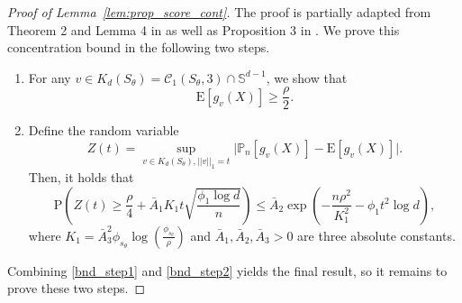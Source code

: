 \documentclass[ejsv2,noshowframe]{imsart}
\theoremstyle{plain}
\theoremstyle{definition}
\theoremstyle{remark}
\newcommand{\norm}[1]{\left|\left| #1 \right|\right|}
\begin{document}
\begin{proof}[Proof of Lemma~\ref{lem:prop_score_cont}]
	The proof is partially adapted from Theorem 2 and Lemma 4 in \cite{cai2023statistical} as well as Proposition 3 in \cite{negahban2010unified}. We prove this concentration bound in the following two steps.
	\begin{enumerate}
		\item For any $v\in K_d(S_{\theta}) = \mathcal{C}_1(S_{\theta},3) \cap \mathbb{S}^{d-1}$, we show that
		\begin{equation}
			\label{bnd_step1}
			\mathrm{E}\left[g_v(X)\right] \geq \frac{\rho}{2}.
		\end{equation}
		\item Define the random variable 
		$$Z(t) = \sup_{v\in K_d(S_{\theta}), \norm{v}_1=t} \big|\mathbb{P}_n\left[g_v(X)\right] - \mathrm{E}\left[g_v(X)\right] \big|.$$
		Then, it holds that
		\begin{equation}
			\label{bnd_step2}
			\mathrm{P}\left(Z(t) \geq \frac{\rho}{4} + \bar{A}_1K_1 t \sqrt{\frac{\phi_1\log d}{n}} \right) \leq \bar{A}_2 \exp\left(-\frac{n\rho^2}{K_1^2} - \phi_1 t^2\log d\right),
		\end{equation}
		where $K_1 = \bar{A}_3^2\phi_{s_{\theta}} \log\left(\frac{\phi_{s_{\theta}}}{\rho}\right)$ and $\bar{A}_1,\bar{A}_2,\bar{A}_3 >0$ are three absolute constants.
	\end{enumerate}
	Combining \eqref{bnd_step1} and \eqref{bnd_step2} yields the final result, so it remains to prove these two steps.
	

\end{proof}
\end{document}

